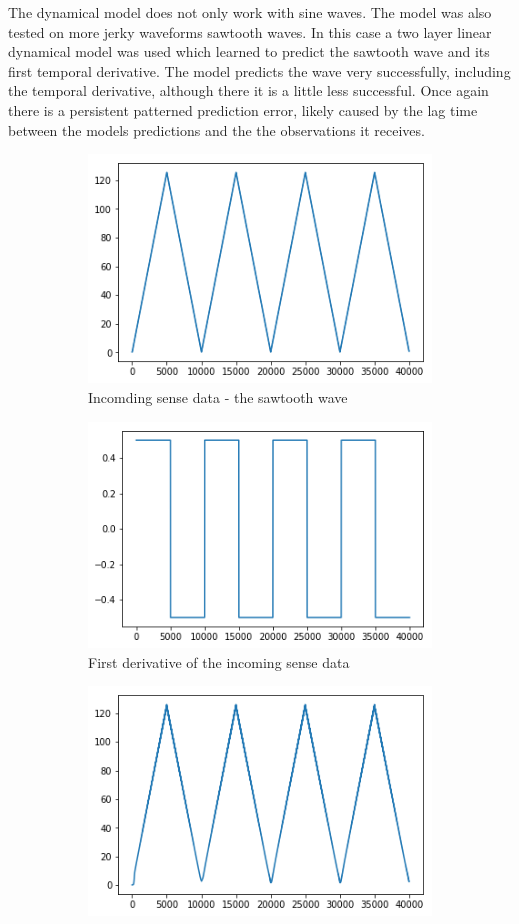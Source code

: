 The dynamical model does not only work with sine waves. The model was also tested on more jerky waveforms sawtooth waves. In this case a two layer linear dynamical model was used which learned to predict the sawtooth wave and its first temporal derivative. The model predicts the wave very successfully, including the temporal derivative, although there it is a little less successful. Once again there is a persistent patterned prediction error, likely caused by the lag time between the models predictions and the the observations it receives. 
\begin{figure}[H]
\centering
\begin{subfigure}{.3\linewidth}
    \centering
    \includegraphics[scale=0.4]{chapter_3_figures/sawtooth_phi.png}
    \caption{Incomding sense data - the sawtooth wave}
\end{subfigure}
    \hfill
\begin{subfigure}{.3\linewidth}
    \centering
    \includegraphics[scale=0.4]{chapter_3_figures/sawtooth_phidot.png}
    \caption{First derivative of the incoming sense data}
\end{subfigure}
\hfill
\begin{subfigure}{.3\linewidth}
    \centering
    \includegraphics[scale=0.4]{chapter_3_figures/sawtooth_pred_phi.png}

\end{subfigure}
\end{figure}
